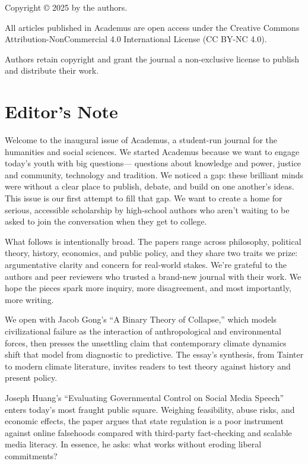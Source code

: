 \documentclass[12pt, letter, openany]{book}
\begin{document}
\frontmatter

\vspace*{\fill}
\begin{center}
Copyright © 2025 by the authors.

All articles published in Academus are open access under the Creative Commons Attribution-NonCommercial 4.0 International License (CC BY-NC 4.0).

Authors retain copyright and grant the journal a non-exclusive license to publish and distribute their work.
\end{center}

\vspace*{\fill}

\chapter{Editor's Note}

Welcome to the inaugural issue of Academus, a student-run journal for the humanities and social sciences. We started Academus because we want to engage today’s youth with big questions— questions about knowledge and power, justice and community, technology and tradition. We noticed a gap: these brilliant minds were without a clear place to publish, debate, and build on one another’s ideas. This issue is our first attempt to fill that gap. We want to create a home for serious, accessible scholarship by high-school authors who aren’t waiting to be asked to join the conversation when they get to college. 

What follows is intentionally broad. The papers range across philosophy, political theory, history, economics, and public policy, and they share two traits we prize: argumentative clarity and concern for real-world stakes. We’re grateful to the authors and peer reviewers who trusted a brand-new journal with their work. We hope the pieces spark more inquiry, more disagreement, and most importantly, more writing. 

We open with Jacob Gong’s “A Binary Theory of Collapse,” which models civilizational failure as the interaction of anthropological and environmental forces, then presses the unsettling claim that contemporary climate dynamics shift that model from diagnostic to predictive. The essay’s synthesis, from Tainter to modern climate literature, invites readers to test theory against history and present policy. 

Joseph Huang’s “Evaluating Governmental Control on Social Media Speech” enters today’s most fraught public square. Weighing feasibility, abuse risks, and economic effects, the paper argues that state regulation is a poor instrument against online falsehoods compared with third-party fact-checking and scalable media literacy. In essence, he asks: what works without eroding liberal commitments? 
\end{document}
